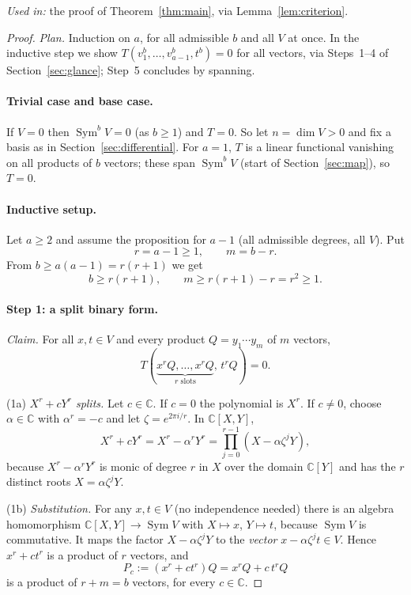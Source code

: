 \documentclass[11pt]{article}
\theoremstyle{remark}
\DeclareMathOperator{\Sym}{Sym}
\newcommand{\C}{\mathbb C}
\begin{document}
\noindent\emph{Used in:} the proof of Theorem~\ref{thm:main}, via
Lemma~\ref{lem:criterion}.

\begin{proof}
\emph{Plan.} Induction on $a$, for all admissible $b$ and all $V$ at once.
In the inductive step we show $T(v_1^b,\dots,v_{a-1}^b,t^b)=0$ for all
vectors, via Steps~1--4 of Section~\ref{sec:glance}; Step~5 concludes by
spanning.

\paragraph{Trivial case and base case.}
If $V=0$ then $\Sym^bV=0$ (as $b\ge1$) and $T=0$. So let $n=\dim V>0$ and
fix a basis as in Section~\ref{sec:differential}. For $a=1$, $T$ is a
linear functional vanishing on all products of $b$ vectors; these span
$\Sym^bV$ (start of Section~\ref{sec:map}), so $T=0$.

\paragraph{Inductive setup.}
Let $a\ge2$ and assume the proposition for $a-1$ (all admissible degrees,
all $V$). Put
\begin{equation}\label{eq:rm}
 r=a-1\ge1,\qquad m=b-r.
\end{equation}
From $b\ge a(a-1)=r(r+1)$ we get
\begin{equation}\label{eq:range}
 b\ge r(r+1),\qquad m\ge r(r+1)-r=r^2\ge1.
\end{equation}

\paragraph{Step 1: a split binary form.}
\emph{Claim.} For all $x,t\in V$ and every product $Q=y_1\cdots y_m$ of $m$
vectors,
\begin{equation}\label{eq:binary}
 T(\underbrace{x^rQ,\ldots,x^rQ}_{r\text{ slots}},\,t^rQ)=0.
\end{equation}

(1a) \emph{$X^r+cY^r$ splits.} Let $c\in\C$. If $c=0$ the polynomial is
$X^r$. If $c\ne0$, choose $\alpha\in\C$ with $\alpha^r=-c$ and let
$\zeta=e^{2\pi i/r}$. In $\C[X,Y]$,
\[
 X^r+cY^r=X^r-\alpha^rY^r=\prod_{j=0}^{r-1}(X-\alpha\zeta^jY),
\]
because $X^r-\alpha^rY^r$ is monic of degree $r$ in $X$ over the domain
$\C[Y]$ and has the $r$ distinct roots $X=\alpha\zeta^jY$.

(1b) \emph{Substitution.} For any $x,t\in V$ (no independence needed) there
is an algebra homomorphism $\C[X,Y]\to\Sym V$ with $X\mapsto x$,
$Y\mapsto t$, because $\Sym V$ is commutative. It maps the factor
$X-\alpha\zeta^jY$ to the \emph{vector} $x-\alpha\zeta^jt\in V$. Hence
$x^r+ct^r$ is a product of $r$ vectors, and
\[
 P_c:=(x^r+ct^r)Q=x^rQ+c\,t^rQ
\]
is a product of $r+m=b$ vectors, for every $c\in\C$.


\end{proof}
\end{document}

